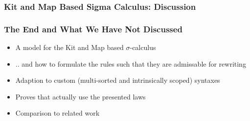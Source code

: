 \documentclass[dvipsnames,aspectratio=169,pdftex]{beamer}
\begin{document}
\begin{frame}[fragile]
  \frametitle{Kit and Map Based Sigma Calculus: Discussion}
  
\end{frame}

\begin{frame}[fragile]
  \frametitle{The End and What We Have Not Discussed}
  \begin{itemize}
    \item A model for the Kit and Map based $\sigma$-calculus
    \item .. and how to formulate the rules such that they are admissable for rewriting
    \item Adaption to custom (multi-sorted and intrinsically scoped) syntaxes
    \item Proves that actually use the presented laws
    \item Comparison to related work
  \end{itemize}
\end{frame}
\end{document}
